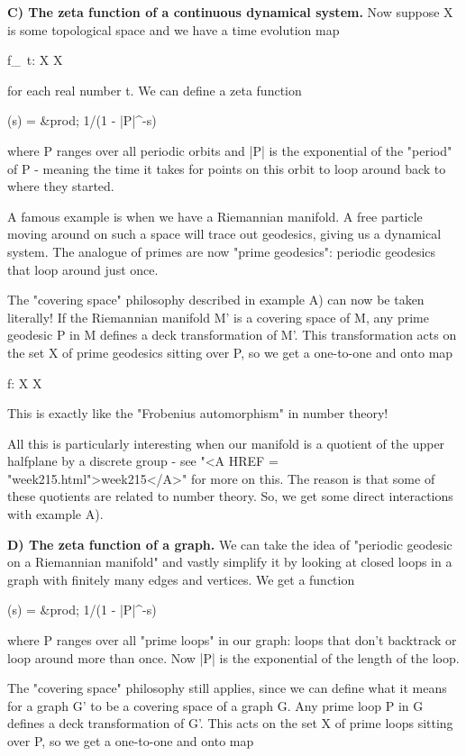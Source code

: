 \textbf{C) The zeta function of a continuous dynamical system.}  
Now suppose X is some topological space and we have a time
evolution map

f_{\ t}: X \to  X

for each real number t.  We can define a zeta function

\zeta (s) = &prod;   1/(1 - |P|^{-s})

where P ranges over all periodic orbits and |P| is the 
exponential of the "period" of P - meaning the time it takes 
for points on this orbit to loop around back to where they started.

A famous example is when we have a Riemannian manifold.  A free particle 
moving around on such a space will trace out geodesics, giving us a 
dynamical system.  The analogue of primes are now "prime geodesics": 
periodic geodesics that loop around just once.

The "covering space" philosophy described in example A) can now be 
taken literally!  If the Riemannian manifold M' is a covering 
space of M, any prime geodesic P in M defines a deck transformation 
of M'.  This transformation acts on the set X of prime geodesics 
sitting over P, so we get a one-to-one and onto map

f: X \to  X

This is exactly like the "Frobenius automorphism" in number theory!

All this is particularly interesting when our manifold is a quotient 
of the upper halfplane by a discrete group - see "<A HREF = "week215.html">week215</A>" for more
on this.  The reason is that some of these quotients are related to 
number theory.   So, we get some direct interactions with example A).

\textbf{D) The zeta function of a graph.}  We can take the idea of
"periodic geodesic on a Riemannian manifold" and vastly simplify
it by looking at closed loops in a graph with finitely many 
edges and vertices.  We get a \zeta  function

\zeta (s) = &prod;   1/(1 - |P|^{-s})

where P ranges over all "prime loops" in our graph: loops that don't 
backtrack or loop around more than once.  Now |P| is the exponential 
of the length of the loop.

The "covering space" philosophy still applies, since we can define 
what it means for a graph G' to be a covering space of a graph G.  
Any prime loop P in G defines a deck transformation of G'.  This 
acts on the set X of prime loops sitting over P, so we get a
one-to-one and onto map

